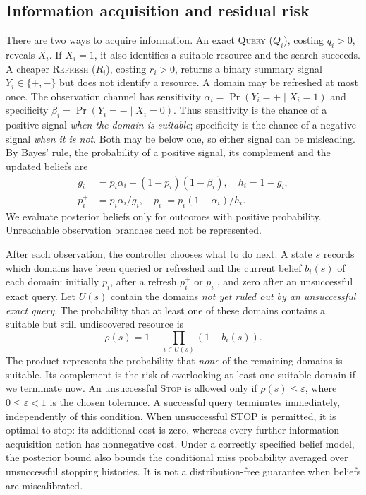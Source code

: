 \documentclass[conference]{IEEEtran}
\newcommand{\QUERY}{\textsc{Query}}
\newcommand{\REFRESH}{\textsc{Refresh}}
\newcommand{\STOP}{\textsc{Stop}}
\begin{document}
\subsection{Information acquisition and residual risk}
There are two ways to acquire information. An exact \QUERY{} ($Q_i$), costing $q_i>0$, reveals $X_i$. If $X_i=1$, it also identifies a suitable resource and the search succeeds. A cheaper \REFRESH{} ($R_i$), costing $r_i>0$, returns a binary summary signal $Y_i\in\{+,-\}$ but does not identify a resource. A domain may be refreshed at most once. The observation channel has sensitivity $\alpha_i=\Pr(Y_i=+\mid X_i=1)$ and specificity $\beta_i=\Pr(Y_i=-\mid X_i=0)$. Thus sensitivity is the chance of a positive signal \emph{when the domain is suitable}; specificity is the chance of a negative signal \emph{when it is not}. Both may be below one, so either signal can be misleading. By Bayes' rule, the probability of a positive signal, its complement and the updated beliefs are
\begin{align}
 g_i&=p_i\alpha_i+(1-p_i)(1-\beta_i),\quad h_i=1-g_i,\\
 p_i^+&=p_i\alpha_i/g_i,\quad
 p_i^-=p_i(1-\alpha_i)/h_i.\label{eq:bayes}
\end{align}
We evaluate posterior beliefs only for outcomes with positive probability. Unreachable observation branches need not be represented.

After each observation, the controller chooses what to do next. A state $s$ records which domains have been queried or refreshed and the current belief $b_i(s)$ of each domain: initially $p_i$, after a refresh $p_i^+$ or $p_i^-$, and zero after an unsuccessful exact query. Let $U(s)$ contain the domains \emph{not yet ruled out by an unsuccessful exact query}. The probability that at least one of these domains contains a suitable but still undiscovered resource is
\begin{equation}
 \rho(s)=1-\prod_{i\in U(s)}(1-b_i(s)).
 \label{eq:risk}
\end{equation}
The product represents the probability that \emph{none} of the remaining domains is suitable. Its complement is the risk of overlooking at least one suitable domain if we terminate now. An unsuccessful \STOP{} is allowed only if $\rho(s)\le\varepsilon$, where $0\le\varepsilon<1$ is the chosen tolerance. A successful query terminates immediately, independently of this condition. When unsuccessful STOP is permitted, it is optimal to stop: its additional cost is zero, whereas every further information-acquisition action has nonnegative cost. Under a correctly specified belief model, the posterior bound also bounds the conditional miss probability averaged over unsuccessful stopping histories. It is not a distribution-free guarantee when beliefs are miscalibrated.
\end{document}
